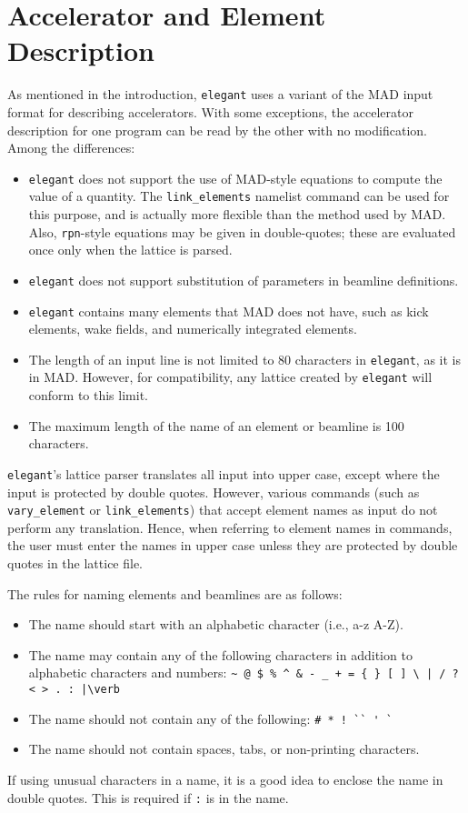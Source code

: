 \documentclass[11pt]{article}
\begin{document}
\newpage 

\section{Accelerator and Element Description}

As mentioned in the introduction, {\tt elegant} uses a variant of the
MAD input format for describing accelerators.  With some exceptions,
the accelerator description for one program can be read by the other
with no modification.  Among the differences:
\begin{itemize}
\item {\tt elegant} does not support the use of MAD-style equations to compute
the value of a quantity.  The \verb|link_elements| namelist command
can be used for this purpose, and is actually more flexible than the
method used by MAD.  Also, \verb|rpn|-style equations may be given
in double-quotes; these are evaluated once only when the lattice
is parsed.
\item {\tt elegant} does not support substitution of parameters in
beamline definitions.
\item {\tt elegant} contains many elements that MAD does not have, such
as kick elements, wake fields, and numerically integrated elements.
\item The length of an input line is not limited to 80 characters in 
{\tt elegant}, as it is in MAD.  However, for compatibility, any lattice
created by {\tt elegant} will conform to this limit.
\item The maximum length of the name of an element or beamline is 100 characters.
\end{itemize}

{\tt elegant}'s lattice parser translates all input into upper case,
except where the input is protected by double quotes.  However,
various commands (such as {\tt vary\_element} or {\tt link\_elements})
that accept element names as input do not perform any translation.
Hence, when referring to element names in commands, the user must
enter the names in upper case unless they are protected by double
quotes in the lattice file.  

The rules for naming elements and beamlines are as follows:
\begin{itemize}
\item The name should start with an alphabetic character (i.e., a-z A-Z).
\item The name may contain any of the following characters in addition to
alphabetic characters and numbers: 
\verb#~ @ $ % ^ & - _ + = { } [ ] \ | / ? < > . : |\verb#
\item The name should not contain any of the following: \verb|# * ! `` ' `|
\item The name should not contain spaces, tabs, or non-printing characters.
\end{itemize}
If using unusual characters in a name, it is a good idea to enclose the name
in double quotes.   This is required if \verb|:| is in the name.
\end{document}

